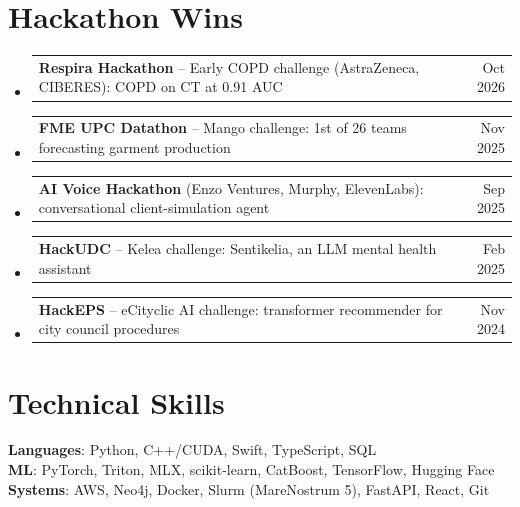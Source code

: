 \documentclass[letterpaper,11pt]{article}
\makeatletter
\newcommand{\resumeProjectHeading}[2]{
    \item
    \begin{tabular*}{0.97\textwidth}{l@{\extracolsep{\fill}}r}
      \small#1 & #2 \\
    \end{tabular*}\vspace{-7pt}
}
\makeatother
\begin{document}
\section{Hackathon Wins}
  \begin{itemize}[leftmargin=0.15in, label={}, topsep=2pt, itemsep=0pt]
    \resumeProjectHeading{\textbf{Respira Hackathon} -- Early COPD challenge (AstraZeneca, CIBERES): COPD on CT at 0.91 AUC}{Oct 2026}
    \resumeProjectHeading{\textbf{FME UPC Datathon} -- Mango challenge: 1st of 26 teams forecasting garment production}{Nov 2025}
    \resumeProjectHeading{\textbf{AI Voice Hackathon} (Enzo Ventures, Murphy, ElevenLabs): conversational client-simulation agent}{Sep 2025}
    \resumeProjectHeading{\textbf{HackUDC} -- Kelea challenge: Sentikelia, an LLM mental health assistant}{Feb 2025}
    \resumeProjectHeading{\textbf{HackEPS} -- eCityclic AI challenge: transformer recommender for city council procedures}{Nov 2024}
  \end{itemize}

\section{Technical Skills}
 \begin{itemize}[leftmargin=0.15in, label={}]
    \small{\item{
     \textbf{Languages}{: Python, C++/CUDA, Swift, TypeScript, SQL} \\
     \textbf{ML}{: PyTorch, Triton, MLX, scikit-learn, CatBoost, TensorFlow, Hugging Face} \\
     \textbf{Systems}{: AWS, Neo4j, Docker, Slurm (MareNostrum 5), FastAPI, React, Git}
    }}
 \end{itemize}
\end{document}
